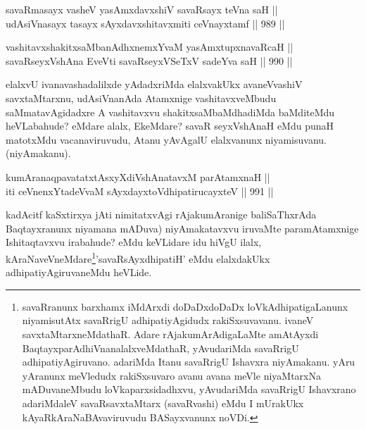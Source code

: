 
\begin{shl}
savaRmasayx vasheV yasAmxdavxshiV savaRsayx teVna saH || \\
udAsiVnasayx tasayx sAyxdavxshitavxmiti ceVnayxtamf \hfill || 989 ||  
\end{shl}

\begin{shl}
vashitavxshakitxsaMbanAdhxnemxYvaM yasAmxtupxnavaRcaH || \\
savaRseyxVshAna EveVti savaRseyxVSeTxV sadeYva saH \hfill || 990 ||  
\end{shl}

\begin{artha}
elalxvU ivanavashadalilxde yAdadxriMda elalxvakUkx avaneVvashiV savxtaMtarxnu, udAsiVnanAda Atamxnige vashitavxveMbudu saMmatavAgidadxre A vashitavxvu shakitxsaMbaMdhadiMda baMditeMdu heVLabahude? eMdare alalx, EkeMdare? savaR seyxVshAnaH eMdu punaH matotxMdu vacanaviruvudu, Atanu yAvAgalU elalxvanunx niyamisuvanu. (niyAmakanu).
\end{artha}


\begin{shl}
kumAranaqpavatatxtAsxyXdiVshAnatavxM parAtamxnaH ||  \\
iti ceVnenxYtadeVvaM sAyxdayxtoV\s dhipatirucayxteV \hfill || 991 ||  
\end{shl}

\begin{artha}
kadAcitf kaSxtirxya jAti nimitatxvAgi rAjakumAranige baliSaThxrAda Baqtayxranunx niyamana mADuva) niyAmakatavxvu iruvaMte paramAtamxnige Ishitaqtavxvu irabahude? eMdu keVLidare idu hiVgU ilalx, kAraNaveVneMdare\ndash \footnote{savaRranunx barxhamx iMdArxdi doDaDxdoDaDx loVkAdhipatigaLanunx niyamisutAtx savaRrigU adhipatiyAgidudx rakiSxsuvavanu. ivaneV savxtaMtarxneMdathaR. Adare rAjakumArAdigaLaMte amAtAyxdi BaqtayxparAdhiVnanalalxveMdathaR, yAvudariMda savaRrigU adhipatiyAgiruvano. adariMda Itanu savaRrigU Ishavxra niyAmakanu. yAru yAranunx meVledudx rakiSxsuvaro avanu avana meVle niyaMtarxNa mADuvaneMbudu loVkaparxsidadhxvu, yAvudariMda savaRrigU Ishavxrano adariMdaleV savaRsavxtaMtarx (savaRvashi) eMdu I mUrakUkx kAyaRkAraNaBAvaviruvudu BASayxvanunx noVDi.}'savaRsAyxdhipatiH' eMdu elalxdakUkx adhipatiyAgiruvaneMdu heVLide.
\end{artha}

